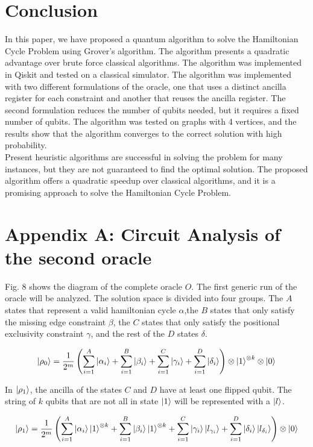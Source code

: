 \documentclass[10pt,a4paper]{article}
\begin{document}
\section{Conclusion}
In this paper, we have proposed a quantum algorithm to solve the Hamiltonian Cycle Problem using Grover's algorithm. The algorithm presents a quadratic advantage over brute force classical algorithms. The algorithm was implemented in Qiskit and tested on a classical simulator. The algorithm was implemented with two different formulations of the oracle, one that uses a distinct ancilla register for each constraint and another that reuses the ancilla register. The second formulation reduces the number of qubits needed, but it requires a fixed number of qubits. The algorithm was tested on graphs with 4 vertices, and the results show that the algorithm converges to the correct solution with high probability.\\
Present heuristic algorithms are successful in solving the problem for many instances, but they are not guaranteed to find the optimal solution. The proposed algorithm offers a quadratic speedup over classical algorithms, and it is a promising approach to solve the Hamiltonian Cycle Problem.\\

 


\section*{Appendix A: Circuit Analysis of the second oracle}
Fig. 8 shows the diagram of the complete oracle $O$. The first generic run of the oracle will be analyzed. The solution space is divided into four groups. The $A$ states that represent a valid hamiltonian cycle $\alpha$,the $B$ states that only satisfy the missing edge constraint $\beta$, the $C$ states that only satisfy the positional exclusivity constraint $\gamma$, and the rest of the $D$ states $\delta$.

$$
\ket{\rho_0} = \frac{1}{2^m} \left( \sum_{i=1}^{A} \ket{\alpha_i} + \sum_{i=1}^{B} \ket{\beta_i} + \sum_{i=1}^{C} \ket{\gamma_i} + \sum_{i=1}^{D} \ket{\delta_i} \right) \otimes \ket{1}^{\otimes k} \otimes \ket{0}
$$

In $\ket{\rho_1}$, the ancilla of the states $C$ and $D$ have at least one flipped qubit. The string of $k$ qubits that are not all in state $\ket{1}$ will be represented with a $\ket{l}$.

$$
\ket{\rho_1} = \frac{1}{2^m} \left( \sum_{i=1}^{A} \ket{\alpha_i} \ket{1}^{\otimes k} + \sum_{i=1}^{B} \ket{\beta_i} \ket{1}^{\otimes k} + \sum_{i=1}^{C} \ket{\gamma_i} \ket{l_{\gamma_i}} + \sum_{i=1}^{D} \ket{\delta_i} \ket{l_{\delta_i}} \right) \otimes \ket{0}
$$
\end{document}
